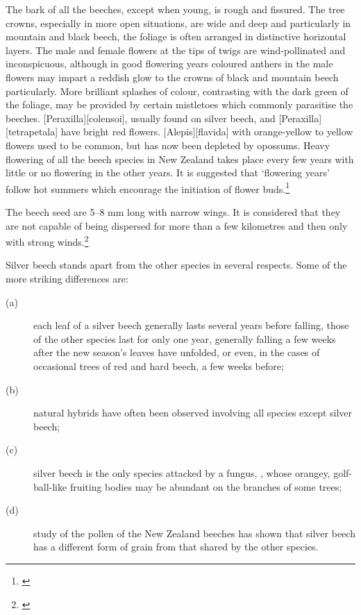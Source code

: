 The bark of all the beeches, except when young, is rough and fissured.
The tree crowns, especially in more open situations, are wide and deep and particularly in mountain and black beech, the foliage is often arranged in distinctive horizontal layers.
The male and female flowers at the tips of twigs are wind-pollinated and inconspicuous, although in good flowering years coloured anthers in the male flowers may impart a reddish glow to the crowns of black and mountain beech particularly.
More brilliant splashes of colour, contrasting with the dark green of the foliage, may be provided by certain mistletoes which commonly parasitise the beeches. [Peraxilla][colensoi], usually found on silver beech, and [Peraxilla][tetrapetala] have bright red flowers. [Alepis][flavida] with orange-yellow to yellow flowers used to be common, but has now been depleted by opossums.
Heavy flowering of all the beech species in New Zealand takes place every few years with little or no flowering in the other years.
It is suggested that `flowering years' follow hot summers which encourage the initiation of flower buds.\footnote{\cite{poole1948flowering}}

The beech seed are 5--8 mm long with narrow wings.
It is considered that they are not capable of being dispersed for more than a few kilometres and then only with strong winds.\footnote{\cite{preest1963dispersal}}

Silver beech stands apart from the other species in several respects.
Some of the more striking differences are:

\begin{description}
\item[{(a)}]each leaf of a silver beech generally lasts several years before falling, those of the other species last for only one year, generally falling a few weeks after the new season's leaves have unfolded, or even, in the cases of occasional trees of red and hard beech, a few weeks before;
\item[{(b)}]natural hybrids have often been observed involving all species except silver beech;
\item[{(c)}]silver beech is the only species attacked by a fungus, , whose orangey, golf-ball-like fruiting bodies may be abundant on the branches of some trees;
\item[{(d)}]study of the pollen of the New Zealand beeches has shown that silver beech has a different form of grain from that shared by the other species.
\end{description}


